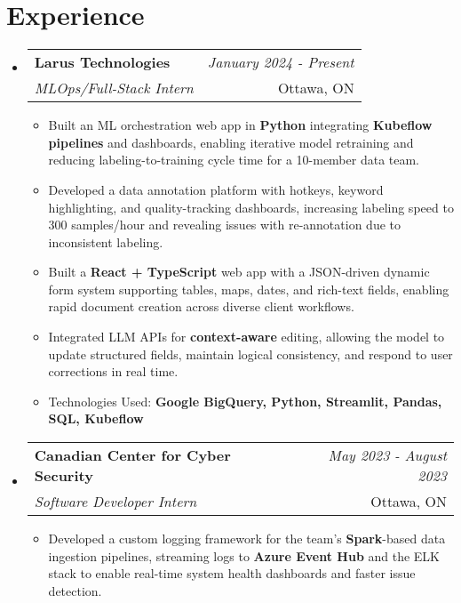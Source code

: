 \documentclass[a4paper,11pt]{article}
\makeatletter
\newcommand{\resumeSubheading}[4]{\vspace{0.5mm}\item\begin{tabular*}{0.98\textwidth}[t]{l@{\extracolsep{\fill}}r}\textbf{#1} & \textit{\footnotesize{#4}} \\\textit{\footnotesize{#3}} &  \footnotesize{#2}\\\end{tabular*}\vspace{-2.4mm}}
\newcommand{\resumeSubHeadingListStart}{\begin{itemize}[leftmargin=*,labelsep=0mm]}
\newcommand{\resumeItemListStart}{\begin{justify}\begin{itemize}[label=\textcolor{black}{--}, leftmargin=3ex, rightmargin=2ex, noitemsep,labelsep=1.2mm,itemsep=0mm]\small}
\newcommand{\resumeSubHeadingListEnd}{\end{itemize}\vspace{2mm}}
\newcommand{\resumeItemListEnd}{\end{itemize}\end{justify}\vspace{-2mm}}
\makeatother
\begin{document}
\section{\textbf{Experience}}
  \resumeSubHeadingListStart
    \resumeSubheading{Larus Technologies}{Ottawa, ON}{MLOps/Full-Stack Intern}{January 2024 - Present}
      \resumeItemListStart
        \item {Built an ML orchestration web app in \textbf{Python} integrating \textbf{Kubeflow pipelines} and dashboards, enabling iterative model retraining and reducing labeling-to-training cycle time for a 10-member data team.}
    \vspace{1mm}
    \item {Developed a data annotation platform with hotkeys, keyword highlighting, and quality-tracking dashboards, increasing labeling speed to 300 samples/hour and revealing issues with re-annotation due to inconsistent labeling.}
    \vspace{1mm}
    \item {Built a \textbf{React + TypeScript} web app with a JSON-driven dynamic form system supporting tables, maps, dates, and rich-text fields, enabling rapid document creation across diverse client workflows.}
    \vspace{1mm}
    \item {Integrated LLM APIs for \textbf{context-aware} editing, allowing the model to update structured fields, maintain logical consistency, and respond to user corrections in real time.}
    \vspace{1mm}
    \item {Technologies Used: \textbf{Google BigQuery, Python, Streamlit, Pandas, SQL, Kubeflow}}
      \resumeItemListEnd
      \vspace{-3mm}
    \resumeSubheading{Canadian Center for Cyber Security}{Ottawa, ON}{Software Developer Intern}{May 2023 - August 2023}
      \resumeItemListStart
        \item {Developed a custom logging framework for the team’s \textbf{Spark}-based data ingestion pipelines, streaming logs to \textbf{Azure Event Hub} and the ELK stack to enable real-time system health dashboards and faster issue detection.}
      \resumeItemListEnd
  \resumeSubHeadingListEnd
\vspace{-6mm}

\end{document}
